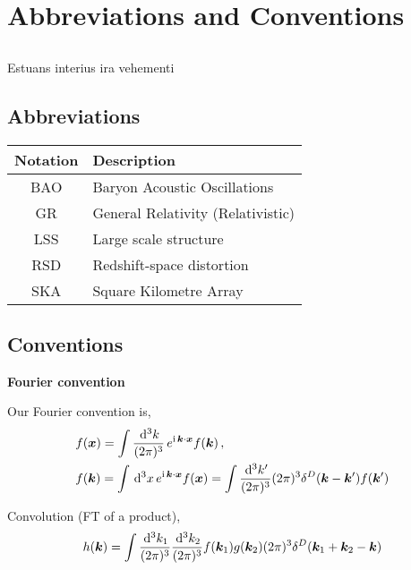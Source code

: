 \chapter*{Abbreviations and Conventions}
\label{chapter:conventions}
\section*{}
\singlespacing

Estuans interius ira vehementi

\section*{Abbreviations}
\setlength{\tabcolsep}{14pt}
\begin{center}
\begin{tabular}{c | l}
	\textbf{Notation} & \textbf{Description} \\
	\hline
	BAO & Baryon Acoustic Oscillations \\
	GR & General Relativity (Relativistic) \\
	LSS & Large scale structure \\
	RSD & Redshift-space distortion \\
	SKA & Square Kilometre Array
\end{tabular}
\end{center}
\section*{Conventions}

\textbf{Fourier convention}


Our Fourier convention is, 
\begin{align*}
	&f(\bm {x}) = \int \frac{\,\mathrm{d}^3 k}{(2\pi)^3}\, e^{\mathrm{i\,} \bm {k} \cdot \bm {x}} f(\bm {k})\,,\\
	&f(\bm {k}) = \int \,\mathrm{d}^3x\, e^{\mathrm{i\,} \bm {k}\cdot\bm {x}} f(\bm {x}) = \int \frac{\,\mathrm{d}^3 k'}{(2\pi)^3} (2\pi)^3 \delta^D(\bm {k}-\bm {k}') f(\bm {k}')
\end{align*}

Convolution (FT of a product), 
\begin{equation}
	h(\bm {k}) = \int \frac{\,\mathrm{d}^3k_1}{(2\pi)^3} \frac{\,\mathrm{d}^3k_2}{(2\pi)^3} f(\bm {k}_1) g(\bm {k}_2) (2\pi)^3 \delta^D(\bm {k}_1 +\bm {k}_2 - \bm {k})
\end{equation}

